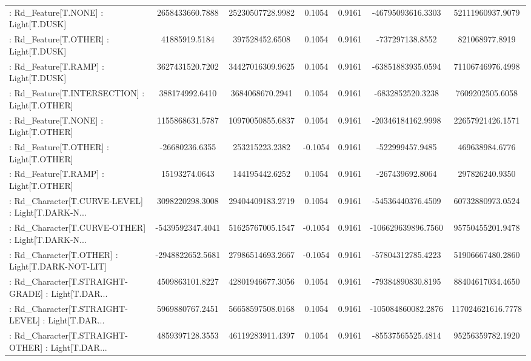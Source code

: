 \begin{longtable}{p{4cm}cccccc}
 : Rd\_Feature[T.NONE] : Light[T.DUSK]              &   2658433660.7888 &  25230507728.9982 &  0.1054 &       0.9161 &  -46795093616.3303 &  52111960937.9079 \\
 : Rd\_Feature[T.OTHER] : Light[T.DUSK]             &     41885919.5184 &    397528452.6508 &  0.1054 &       0.9161 &    -737297138.8552 &    821068977.8919 \\
 : Rd\_Feature[T.RAMP] : Light[T.DUSK]              &   3627431520.7202 &  34427016309.9625 &  0.1054 &       0.9161 &  -63851883935.0594 &  71106746976.4998 \\
 : Rd\_Feature[T.INTERSECTION] : Light[T.OTHER]     &    388174992.6410 &   3684068670.2941 &  0.1054 &       0.9161 &   -6832852520.3238 &   7609202505.6058 \\
 : Rd\_Feature[T.NONE] : Light[T.OTHER]             &   1155868631.5787 &  10970050855.6837 &  0.1054 &       0.9161 &  -20346184162.9998 &  22657921426.1571 \\
 : Rd\_Feature[T.OTHER] : Light[T.OTHER]            &    -26680236.6355 &    253215223.2382 & -0.1054 &       0.9161 &    -522999457.9485 &    469638984.6776 \\
 : Rd\_Feature[T.RAMP] : Light[T.OTHER]             &     15193274.0643 &    144195442.6252 &  0.1054 &       0.9161 &    -267439692.8064 &    297826240.9350 \\
 : Rd\_Character[T.CURVE-LEVEL] : Light[T.DARK-N... &   3098220298.3008 &  29404409183.2719 &  0.1054 &       0.9161 &  -54536440376.4509 &  60732880973.0524 \\
 : Rd\_Character[T.CURVE-OTHER] : Light[T.DARK-N... &  -5439592347.4041 &  51625767005.1547 & -0.1054 &       0.9161 & -106629639896.7560 &  95750455201.9478 \\
 : Rd\_Character[T.OTHER] : Light[T.DARK-NOT-LIT]   &  -2948822652.5681 &  27986514693.2667 & -0.1054 &       0.9161 &  -57804312785.4223 &  51906667480.2860 \\
 : Rd\_Character[T.STRAIGHT-GRADE] : Light[T.DAR... &   4509863101.8227 &  42801946677.3056 &  0.1054 &       0.9161 &  -79384890830.8195 &  88404617034.4650 \\
 : Rd\_Character[T.STRAIGHT-LEVEL] : Light[T.DAR... &   5969880767.2451 &  56658597508.0168 &  0.1054 &       0.9161 & -105084860082.2876 & 117024621616.7778 \\
 : Rd\_Character[T.STRAIGHT-OTHER] : Light[T.DAR... &   4859397128.3553 &  46119283911.4397 &  0.1054 &       0.9161 &  -85537565525.4814 &  95256359782.1920 \\

\end{longtable}
